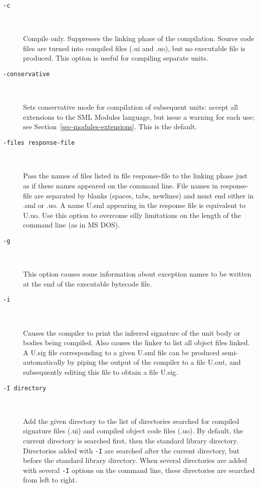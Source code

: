 \documentclass[fleqn]{article}
\begin{document}
\begin{description}
\item[{\tt -c}]\mbox{ }

  Compile only. Suppresses the linking phase of the compilation.
  Source code files are turned into compiled files (.ui and .uo), but
  no executable file is produced.  This option is useful for compiling
  separate units.

\item[{\tt -conservative}]\mbox{ }
  
  Sets conservative mode for compilation of subsequent units: accept
  all extensions to the SML Modules language, but issue a warning for
  each use; see Section~\ref{sec-modules-extensions}.  This is the
  default.

\item[{\tt -files {\rm response-file}}]\mbox{ }

  Pass the names of files listed in file response-file to the linking
  phase just as if these names appeared on the command line.  File
  names in response-file are separated by blanks (spaces, tabs,
  newlines) and must end either in .sml or .uo.  A name U.sml
  appearing in the response file is equivalent to U.uo.  Use this
  option to overcome silly limitations on the length of the
  command line (as in MS DOS).

\item[{\tt -g}]\mbox{ }

  This option causes some information about exception names to be
  written at the end of the executable bytecode file.  

\item[{\tt -i}]\mbox{ }

  Causes the compiler to print the inferred signature of the unit body
  or bodies being compiled.  Also causes the linker to list all object
  files linked.  A U.sig file corresponding to a given U.sml file can
  be produced semi-automatically by piping the output of the compiler
  to a file U.out, and subsequently editing this file to obtain a file
  U.sig.

\item[{\tt -I {\rm directory}}]\mbox{ }

  Add the given directory to the list of directories searched for
  compiled signature files (.ui) and compiled object code files (.uo).
  By default, the current directory is searched first, then the
  standard library directory.  Directories added with {\tt -I} are
  searched after the current directory, but before the standard
  library directory.  When several directories are added with several
  {\tt -I} options on the command line, these directories are searched
  from left to right.


\end{description}
\end{document}
